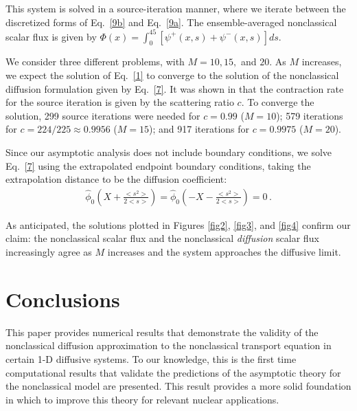 \documentclass{anstrans}
\newcommand{\bl}{\big<}
\newcommand{\bg}{\big>}
\begin{document}



This system is solved in a source-iteration manner, where we iterate between the discretized forms of Eq.\ \eqref{9b} and Eq.\ \eqref{9a}. The ensemble-averaged nonclassical scalar flux is given by $\Phi(x) = \int_0^{45}[\psi^+(x,s)+\psi^-(x,s)]ds$.

We consider three different problems, with $M=10, 15,$ and $20$. As $M$ increases, we expect the solution of Eq.\ \eqref{1} to converge to the
solution of the nonclassical diffusion formulation given by Eq.\ \eqref{7}.
It was shown in \cite{kry13} that the contraction
rate for the source iteration is given by the scattering ratio $c$. To converge the solution, 299 source
iterations were needed for $c= 0.99$ ($M=10$); 579 iterations for $c = 224/225\approx 0.9956$ ($M=15$); and 917 iterations for $c= 0.9975$ ($M=20$).

Since our asymptotic analysis does not include boundary conditions, we solve Eq.\ \eqref{7} using the extrapolated endpoint boundary conditions, taking the extrapolation distance to be the diffusion coefficient:
\begin{align}
\hat\phi_0\left(X+\frac{\bl s^2\bg}{2\bl s \bg}\right) = \hat\phi_0\left(-X-\frac{\bl s^2\bg}{2\bl s\bg}\right)=0\,.\nonumber
\end{align}

As anticipated, the solutions plotted in Figures \ref{fig2}, \ref{fig3}, and \ref{fig4} confirm our claim: the nonclassical scalar flux and the nonclassical \textit{diffusion} scalar flux increasingly agree as $M$ increases and the system approaches the diffusive limit.




\section{Conclusions}
This paper provides numerical results that demonstrate the validity of the nonclassical diffusion approximation to the nonclassical transport equation in certain 1-D diffusive systems. To our knowledge, this is the first time computational results that validate the predictions of the asymptotic theory for the nonclassical model are presented. This result provides a more solid foundation 
in which to improve this theory for relevant nuclear applications.
\end{document}
